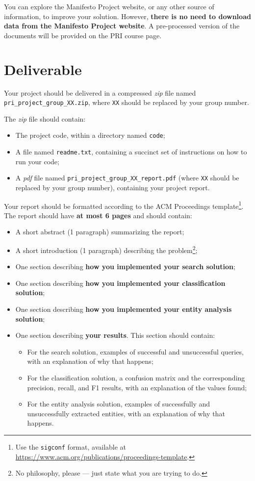 \documentclass[12pt]{article}
\begin{document}
You can explore the Manifesto Project website, or any other source of
information, to improve your solution. However, \textbf{there is no need to
  download data from the Manifesto Project website}. A pre-processed version of
the documents will be provided on the PRI course page.


\section{Deliverable}
\label{sec:deliverable}

Your project should be delivered in a compressed \emph{zip} file named
\texttt{pri\_project\_group\_XX.zip}, where \texttt{XX} should be replaced by
your group number.

The \emph{zip} file should contain:
\begin{itemize}
\item The project code, within a directory named \texttt{code};
\item A file named \texttt{readme.txt}, containing a succinct set of instructions
    on how to run your code;
\item A \emph{pdf} file named \texttt{pri\_project\_group\_XX\_report.pdf}
    (where \texttt{XX} should be replaced by your group number), containing
    your project report.
\end{itemize}

Your report should be formatted according to the ACM Proceedings template\footnote{Use the \texttt{sigconf} format, available at \url{https://www.acm.org/publications/proceedings-template}.}. The report should have \textbf{at most 6 pages} and should contain:
\begin{itemize}
\item A short abstract (1 paragraph) summarizing the report;
\item A short introduction (1 paragraph) describing the problem\footnote{No philosophy, please --- just state what you are trying to do.};
\item One section describing \textbf{how you implemented your search solution};
\item One section describing \textbf{how you implemented your classification solution};
\item One section describing \textbf{how you implemented your entity analysis solution};
\item One section describing \textbf{your results}. This section should contain:
    \begin{itemize}
    \item For the search solution, examples of successful and unsuccessful
        queries, with an explanation of why that happens;
    \item For the classification solution, a confusion matrix and the corresponding precision, recall, and F1 results, with an explanation of the values found;
    \item For the entity analysis solution, examples of successfully and unsuccessfully extracted entities, with an explanation of why that happens.
    \end{itemize}
\end{itemize}
\end{document}
